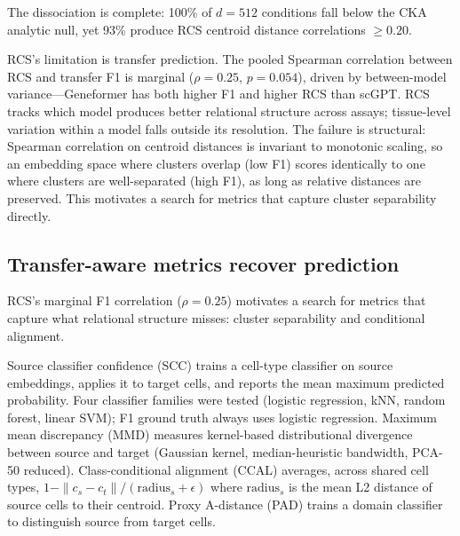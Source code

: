 \documentclass[11pt]{article}
\begin{document}
The dissociation is complete: 100\% of $d = 512$ conditions fall below
the CKA analytic null, yet 93\% produce RCS centroid distance
correlations $\geq 0.20$.

RCS's limitation is transfer prediction. The pooled Spearman correlation
between RCS and transfer F1 is marginal ($\rho = 0.25$, $p = 0.054$),
driven by between-model variance---Geneformer has both higher F1 and
higher RCS than scGPT. RCS tracks which model produces better relational
structure across assays; tissue-level variation within a model falls
outside its resolution. The failure is structural: Spearman correlation
on centroid distances is invariant to monotonic scaling, so an embedding
space where clusters overlap (low F1) scores identically to one where
clusters are well-separated (high F1), as long as relative distances are
preserved. This motivates a search for metrics that capture cluster
separability directly.


\subsection{Transfer-aware metrics recover prediction}
\label{sec:scc}

RCS's marginal F1 correlation ($\rho = 0.25$) motivates a search for
metrics that capture what relational structure misses: cluster
separability and conditional alignment.

Source classifier confidence (SCC) trains a cell-type classifier on
source embeddings, applies it to target cells, and reports the mean
maximum predicted probability. Four classifier families were tested
(logistic regression, kNN, random forest, linear SVM); F1 ground truth
always uses logistic regression. Maximum mean discrepancy (MMD) measures kernel-based
distributional divergence between source and target (Gaussian kernel,
median-heuristic bandwidth, PCA-50 reduced). Class-conditional alignment
(CCAL) averages, across shared cell types, $1 - \|c_s - c_t\| /
(\text{radius}_s + \epsilon)$ where $\text{radius}_s$ is the mean L2
distance of source cells to their centroid. Proxy A-distance (PAD)
trains a domain classifier to distinguish source from target cells.
\end{document}
